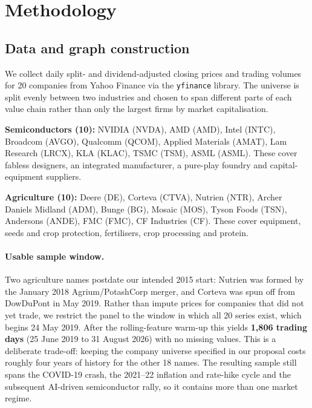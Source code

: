 \section{Methodology}
\label{sec:methodology}

\subsection{Data and graph construction}

We collect daily split- and dividend-adjusted closing prices and trading volumes for 20 companies from Yahoo Finance via the \texttt{yfinance} library. The universe is split evenly between two industries and chosen to span different parts of each value chain rather than only the largest firms by market capitalisation.

\textbf{Semiconductors (10):} NVIDIA (NVDA), AMD (AMD), Intel (INTC), Broadcom (AVGO), Qualcomm (QCOM), Applied Materials (AMAT), Lam Research (LRCX), KLA (KLAC), TSMC (TSM), ASML (ASML). These cover fabless designers, an integrated manufacturer, a pure-play foundry and capital-equipment suppliers.

\textbf{Agriculture (10):} Deere (DE), Corteva (CTVA), Nutrien (NTR), Archer Daniels Midland (ADM), Bunge (BG), Mosaic (MOS), Tyson Foods (TSN), Andersons (ANDE), FMC (FMC), CF Industries (CF). These cover equipment, seeds and crop protection, fertilisers, crop processing and protein.

\paragraph{Usable sample window.} Two agriculture names postdate our intended 2015 start: Nutrien was formed by the January 2018 Agrium/PotashCorp merger, and Corteva was spun off from DowDuPont in May 2019. Rather than impute prices for companies that did not yet trade, we restrict the panel to the window in which all 20 series exist, which begins 24 May 2019. After the rolling-feature warm-up this yields \textbf{1{,}806 trading days} (25 June 2019 to 31 August 2026) with no missing values. This is a deliberate trade-off: keeping the company universe specified in our proposal costs roughly four years of history for the other 18 names. The resulting sample still spans the COVID-19 crash, the 2021--22 inflation and rate-hike cycle and the subsequent AI-driven semiconductor rally, so it contains more than one market regime.

